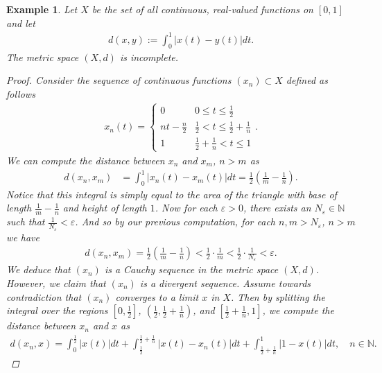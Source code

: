 \documentclass[11pt]{article}
\theoremstyle{mystyle}
\newtheorem{protoexamp}{Example}[section]
\newenvironment{examp}
{\colorlet{shadecolor}{orange!15}\begin{shaded}\begin{protoexamp}}
{\end{protoexamp}\end{shaded}}
\newcommand{\0}{\mathbf{0}}
\begin{document}
\begin{examp}\label{continuousincomplete}
Let $X$ be the set of all continuous, real-valued functions on $[0, 1]$ and let 
\begin{align*}
    d(x, y) := \int_0^1 |x(t) - y(t)| dt.
\end{align*}
The metric space $(X, d)$ is incomplete.
\begin{proof}
Consider the sequence of continuous functions $(x_n) \subset X$ defined as follows
\begin{align*}
    x_n(t) = \begin{cases}
    0 & 0 \leq t \leq \frac{1}{2}\\
    nt - \frac{n}{2} & \frac{1}{2} < t \leq \frac{1}{2} + \frac{1}{n}\\
    1 & \frac{1}{2} + \frac{1}{n} < t \leq 1
    \end{cases}.
\end{align*}
We can compute the distance between $x_n$ and $x_m$, $n > m$ as
\begin{align*}
    d(x_n, x_m) &= \int_0^1 |x_n(t) - x_m(t)|dt = \frac{1}{2}\left(\frac{1}{m} - \frac{1}{n}\right).
\end{align*}
Notice that this integral is simply equal to the area of the triangle with base of length $\frac{1}{m} - \frac{1}{n}$ and height of length $1$.\newline
Now for each $\varepsilon > 0$, there exists an $N_{\varepsilon} \in \mathbb{N}$ such that $\frac{1}{N_{\varepsilon}} < \varepsilon$. And so by our previous computation, for each $n, m > N_{\varepsilon}$, $n > m$ we have
\begin{align*}
  d(x_n, x_m) =  \frac{1}{2}\left(\frac{1}{m} - \frac{1}{n}\right) < \frac{1}{2} \cdot \frac{1}{m}  < \frac{1}{2} \cdot \frac{1}{N_{\varepsilon}} <  \varepsilon.
\end{align*}
We deduce that $(x_n)$ is a Cauchy sequence in the metric space $(X, d)$.\newline
However, we claim that $(x_n)$ is a divergent sequence. Assume towards contradiction that $(x_n)$ converges to a limit $x$ in $X$. Then by splitting the integral over the regions $\left[0, \frac{1}{2} \right]$, $\left(\frac{1}{2},\frac{1}{2} + \frac{1}{n} \right)$, and $\left[\frac{1}{2} + \frac{1}{n}, 1 \right]$, we compute the distance between $x_n$ and $x$ as
\begin{align*}
    d(x_n, x) = \int_0^{\frac{1}{2}}|x(t)| dt + \int_{\frac{1}{2}}^{\frac{1}{2} + \frac{1}{n}}|x(t) - x_n(t)| dt  +  \int_{\frac{1}{2} + \frac{1}{n}}^1|1-x(t)| dt, \quad n \in \mathbb{N}.

\end{align*}
\end{proof}
\end{examp}
\end{document}
